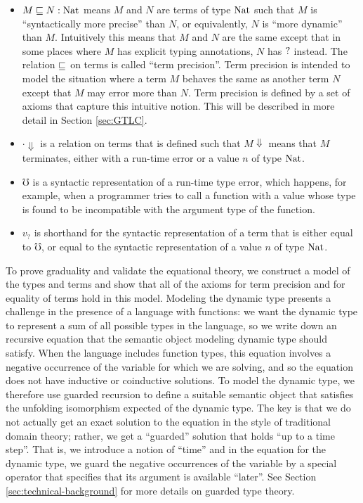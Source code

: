 \begin{itemize}
  \item $M \sqsubseteq N : \text{Nat}$ means $M$ and $N$ are terms of type $\text{Nat}$ such that
  $M$ is ``syntactically more precise'' than $N$, or equivalently, $N$ is 
  ``more dynamic'' than $M$. Intuitively this means that $M$ and $N$ are the
  same except that in some places where $M$ has explicit typing annotations,
  $N$ has $?$ instead. The relation $\sqsubseteq$ on terms is called ``term precision''.
  Term precision is intended to model the situation where a term $M$ behaves the
  same as another term $N$ except that $M$ may error more than $N$.
  Term precision is defined by a set of axioms that capture this intuitive notion.
  This will be described in more detail in Section \ref{sec:GTLC}.

  \item $\cdot \Downarrow$ is a relation on terms that is defined such that $M \Downarrow$ means
  that $M$ terminates, either with a run-time error or a value $n$ of type $\text{Nat}$.

  \item $\mho$ is a syntactic representation of a run-time type error, which
  happens, for example, when a programmer tries to call a function with a value whose type
  is found to be incompatible with the argument type of the function.

  \item $v_?$ is shorthand for the syntactic representation of a term that is either equal to
  $\mho$, or equal to the syntactic representation of a value $n$ of type $\text{Nat}$.
\end{itemize}


To prove graduality and validate the equational theory, we construct a model of the types
and terms and show that all of the axioms for term precision and for equality of terms
hold in this model. Modeling the dynamic type presents a challenge in the presence of a
language with functions: we want the dynamic type to represent a sum of all possible types
in the language, so we write down an recursive equation that the semantic object modeling
dynamic type should satisfy. When the language includes function types, this equation involves a
negative occurrence of the variable for which we are solving, and so the equation 
does not have inductive or coinductive solutions.
%
To model the dynamic type, we therefore use guarded recursion to define a suitable
semantic object that satisfies the unfolding isomorphism expected of the dynamic type.
The key is that we do not actually get an exact solution to the equation in the style
of traditional domain theory; rather, we get a ``guarded'' solution that holds ``up to a time step''.
%
That is, we introduce a notion of ``time'' and in the equation for the dynamic type,
we guard the negative occurrences of the variable by a special operator that
specifies that its argument is available ``later''.
See Section \ref{sec:technical-background} for more details on guarded type theory.

